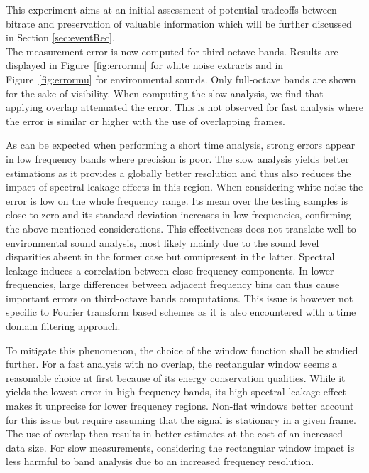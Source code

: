 \documentclass[sensors,article,submit,moreauthors,pdftex,10pt,a4paper]{mdpi}
\begin{document}

This experiment aims at an initial assessment of potential tradeoffs between bitrate and preservation of valuable information which will be further discussed in Section \ref{sec:eventRec}.\\

The measurement error is now computed for third-octave bands. Results are displayed in Figure~\ref{fig:errormn} for white noise extracts and in Figure~\ref{fig:errormu} for environmental sounds. Only full-octave bands are shown for the sake of visibility. When computing the slow analysis, we find that applying overlap attenuated the error. This is not observed for fast analysis where the error is similar or higher with the use of overlapping frames.

As can be expected when performing a short time analysis, strong errors appear in low frequency bands where precision is poor. The slow analysis yields better estimations as it provides a globally better resolution and thus also reduces the impact of spectral leakage effects in this region. When considering white noise the error is low on the whole frequency range. Its mean over the testing samples is close to zero and its standard deviation increases in low frequencies, confirming the above-mentioned considerations. This effectiveness does not translate well to environmental sound analysis, most likely mainly due to the sound level disparities absent in the former case but omnipresent in the latter. Spectral leakage induces a correlation between close frequency components. In lower frequencies, large differences between adjacent frequency bins can thus cause important errors on third-octave bands computations. This issue is however not specific to Fourier transform based schemes as it is also encountered with a time domain filtering approach.

To mitigate this phenomenon, the choice of the window function shall be studied further. For a fast analysis with no overlap, the rectangular window seems a reasonable choice at first because of its energy conservation qualities. While it yields the lowest error in high frequency bands, its high spectral leakage effect makes it unprecise for lower frequency regions. Non-flat windows better account for this issue but require assuming that the signal is stationary in a given frame. The use of overlap then results in better estimates at the cost of an increased data size. For slow measurements, considering the rectangular window impact is less harmful to band analysis due to an increased frequency resolution.
\end{document}

